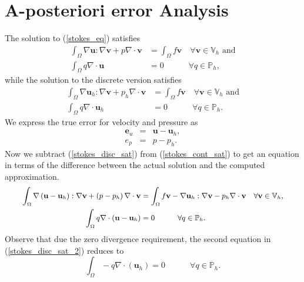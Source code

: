 \documentclass[12pt,a4paper]{article}
\theoremstyle{definition}
\begin{document}
\section{A-posteriori error Analysis}
The solution to (\ref{stokes_eq}) satisfies
\begin{equation}\label{stokes_cont_sat}
\begin{aligned}
 \int_{\Omega}\nabla\textbf{u}:\nabla\textbf{v}+p\nabla\cdot\textbf{v} &=\int_{\Omega}f\textbf{v} \quad \forall 
	\textbf{v} \in \mathbb{V}_h \text{ and} \\
	\int_{\Omega}q\nabla\cdot\textbf{u}&=0\quad \quad\quad\forall q \in\mathbb{P}_h,
	\end{aligned}
\end{equation}
while the solution to the discrete version satisfies
\begin{equation}\label{stokes_disc_sat}
\begin{aligned}
  \int_{\Omega}\nabla\textbf{u}_h:\nabla\textbf{v}+p_h\nabla\cdot\textbf{v} &=\int_{\Omega}f\textbf{v} \quad \forall 
 \textbf{v} \in \mathbb{V}_h \text{ and} \\
 \int_{\Omega}q\nabla\cdot\textbf{u}_h&=0\quad \quad\quad\forall q \in\mathbb{P}_h.
 \end{aligned}
\end{equation}
We express the true error for velocity and pressure as 
\begin{eqnarray}
	\textbf{e}_u &=& \textbf{u}-\textbf{u}_h,\\
	e_p &=& p-p_h.
\end{eqnarray}
Now we subtract (\ref{stokes_disc_sat}) from (\ref{stokes_cont_sat}) to get an equation in terms of the difference between the actual solution and the computed approximation.
\begin{equation}\label{stokes_disc_sat_2}\small
\begin{aligned}\small
\int_{\Omega}\nabla\left(\textbf{u}-\textbf{u}_h\right):\nabla\textbf{v}+\left(p-p_h\right)\nabla\cdot\textbf{v} &=\int_{\Omega}f\textbf{v} -\nabla\textbf{u}_h:\nabla\textbf{v}-p_h\nabla\cdot\textbf{v} \quad \forall 
\textbf{v} \in \mathbb{V}_h, \\
\int_{\Omega}q\nabla\cdot\left(\textbf{u}-\textbf{u}_h\right)&=0\quad \quad\quad\forall q \in\mathbb{P}_h.
\end{aligned}
\end{equation}
Observe that due the zero divergence requirement, the second equation in (\ref{stokes_disc_sat_2}) reduces to 
\begin{equation}
\int_{\Omega}-q\nabla\cdot\left(\textbf{u}_h\right)=0\quad \quad\quad\forall q \in\mathbb{P}_h.
\end{equation}
\end{document}
